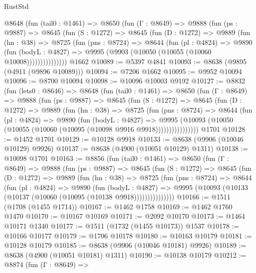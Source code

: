 \begin{lexlean}{RustStd}
\begin{coremodule}
      @8648
        (fun (tail0 : @1461) =>
        @8650
          (fun (Γ : @8649) =>
          @9888
            (fun (ps : @9887) =>
            @8645
              (fun (S : @1272) =>
              @8645
                (fun (D : @1272) =>
                @9889
                  (fun (hn : @38) =>
                  @8725
                    (fun (pns : @8724) =>
                    @8644
                      (fun (pl : @4824) =>
                      @9890
                        (fun (bodyL : @4827) =>
                        @9995 (@9903 (@10050 (@10055 (@10060 @10008)))))))))))))))
    @1662
@10089 := @5397 @4841
@10093 := @8638 (@9895 (@4911 (@9896 @10089)))
@10094 := @7206 @1662
@10095 := @9952 @10094
@10096 := @8700 @10094
@10098 := @10096 @10003 @9192
@10127 := @8832
    (fun (lets0 : @8646) =>
    @8648
      (fun (tail0 : @1461) =>
      @8650
        (fun (Γ : @8649) =>
        @9888
          (fun (ps : @9887) =>
          @8645
            (fun (S : @1272) =>
            @8645
              (fun (D : @1272) =>
              @9889
                (fun (hn : @38) =>
                @8725
                  (fun (pns : @8724) =>
                  @8644
                    (fun (pl : @4824) =>
                    @9890
                      (fun (bodyL : @4827) =>
                      @9995
                        (@10093 (@10050 (@10055 (@10060 (@10095 (@10098 @9916 @9918))))))))))))))))
    @1701
@10128 := @1452 @1701
@10129 := @10128 @9918
@10133 := @8638 (@9906 (@10046 @10129) @9926)
@10137 := @8638 (@4900 (@10051 @10129) @1311)
@10138 := @10098 @1701
@10163 := @8856
    (fun (tail0 : @1461) =>
    @8650
      (fun (Γ : @8649) =>
      @9888
        (fun (ps : @9887) =>
        @8645
          (fun (S : @1272) =>
          @8645
            (fun (D : @1272) =>
            @9889
              (fun (hn : @38) =>
              @8725
                (fun (pns : @8724) =>
                @8644
                  (fun (pl : @4824) =>
                  @9890
                    (fun (bodyL : @4827) =>
                    @9995 (@10093 (@10133 (@10137 (@10060 (@10095 (@10138 @9918)))))))))))))))
@10166 := @1511 (@1708 (@1455 @1714))
@10167 := @1462 @1758
@10169 := @1462 @1760 @1470
@10170 := @10167 @10169
@10171 := @2092 @10170
@10173 := @1464 @10171 @1340
@10177 := @1511 (@1732 (@1455 @10173)) @1537
@10178 := @10166 @10177
@10179 := @1706 @10178
@10180 := @10163 @10179
@10181 := @10128 @10179
@10185 := @8638 (@9906 (@10046 @10181) @9926)
@10189 := @8638 (@4900 (@10051 @10181) @1311)
@10190 := @10138 @10179
@10212 := @8874
    (fun (Γ : @8649) =>

\end{coremodule}
\end{lexlean}
